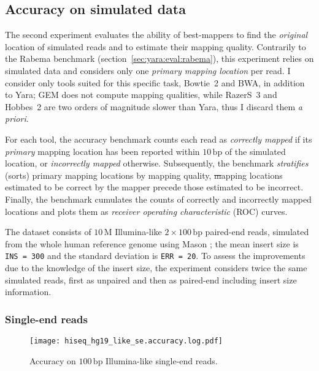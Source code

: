 \subsection{Accuracy on simulated data}
\label{sec:yara:eval:accuracy}

The second experiment evaluates the ability of best-mappers to find the \emph{original} location of simulated reads and to estimate their mapping quality.
Contrarily to the Rabema benchmark (section~\ref{sec:yara:eval:rabema}), this experiment relies on simulated data and considers only one \emph{primary mapping location} per read.
I consider only tools suited for this specific task, \ie Bowtie~2 and BWA, in addition to Yara; GEM does not compute mapping qualities, while RazerS~3 and Hobbes~2 are two orders of magnitude slower than Yara, thus I discard them \emph{a priori}.

For each tool, the accuracy benchmark counts each read as \emph{correctly mapped} if its \emph{primary} mapping location has been reported within $10\,\text{bp}$ of the simulated location, or \emph{incorrectly mapped} otherwise.
Subsequently, the benchmark \emph{stratifies} (\ie sorts) primary mapping locations by mapping quality, \st mapping locations estimated to be correct by the mapper precede those estimated to be incorrect.
Finally, the benchmark cumulates the counts of correctly and incorrectly mapped locations and plots them as \emph{receiver operating characteristic} (ROC) curves.

The dataset consists of $10\,\text{M}$ Illumina-like $2 \times 100\,\text{bp}$ paired-end reads, simulated from the whole human reference genome using Mason \citep{Holtgrewe2010}; the mean insert size is \texttt{INS = 300} and the standard deviation is \texttt{ERR = 20}.
To assess the improvements due to the knowledge of the insert size, the experiment considers twice the same simulated reads, first as unpaired and then as paired-end including insert size information.

\subsubsection{Single-end reads}

\begin{figure}[t]
\begin{center}
\caption[Yara accuracy on Illumina-like single-end reads]{Accuracy on $100\,\text{bp}$ Illumina-like single-end reads.}
\label{fig:yara:accuracy-se}
\texttt{[image: hiseq\_hg19\_like\_se.accuracy.log.pdf]}
\end{center}
\end{figure}

